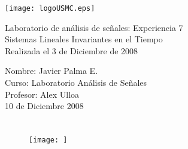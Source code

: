 \documentclass[a4paper,11pt]{article} %
\numberwithin{equation}{section} %
\numberwithin{figure}{section} %
\numberwithin{table}{section} %
\begin{document}
\begin{titlepage} %
\thispagestyle{empty} %
\begin{flushleft} %
\texttt{[image: logoUSMC.eps]} %
\vfill %
\end{flushleft}

\vspace{2cm} %
\begin{center} %
{\huge Laboratorio de análisis de señales: Experiencia 7 \\ %
Sistemas Lineales Invariantes en el Tiempo\\
Realizada el 3 de Diciembre de 2008
}
\end{center}

\vspace{6cm}
\begin{flushright} %
Nombre: Javier Palma E.\\
Curso: Laboratorio Análisis de Señales\\
Profesor: Alex Ulloa\\
10 de Diciembre 2008
\end{flushright}
\end{titlepage}

\setcounter{page}{1} %

\tableofcontents %
\newpage

\section{} %
\subsection{} %
\subsubsection{} %
\subsubsubsection{} %

\begin{figure}[h] %
\centering
\texttt{[image: ]} %
\caption{} %
\label{} %
\end{figure}
\end{document}
